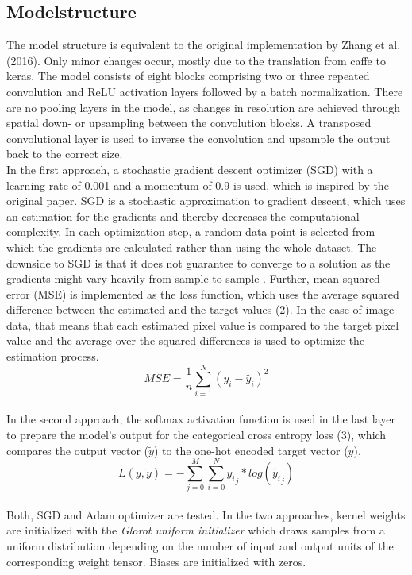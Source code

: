 \documentclass[12pt,letterpaper]{article}
\begin{document}
\subsection{Modelstructure}
The model structure is equivalent to the original implementation by Zhang et al. (2016). Only minor changes occur, mostly due to the translation from caffe to keras. The model consists of eight blocks comprising two or three repeated convolution and ReLU activation layers followed by a batch normalization. There are no pooling layers in the model, as changes  in  resolution  are  achieved  through  spatial  down-  or  upsampling between the convolution blocks. A transposed convolutional layer is used to inverse the convolution and upsample the output back to the correct size.\\
In the first approach, a stochastic gradient descent optimizer (SGD) with a learning rate of 0.001 and a momentum of 0.9 is used, which is inspired by the original paper. SGD is a stochastic approximation to gradient descent, which uses an estimation for the gradients and thereby decreases the computational complexity. In each optimization step, a random data point is selected from which the gradients are calculated rather than using the whole dataset. The downside to SGD is that it does not guarantee to converge to a solution as the gradients might vary heavily from sample to sample \citep{Lecture.2019}. Further,  mean squared error (MSE) is implemented as the loss function, which uses the average squared difference between the estimated and the target values (2). In the case of image data, that means that each estimated pixel value is compared to the target pixel value and the average over the squared differences is used to optimize the estimation process.
\begin{equation}
MSE = \frac{1}{n}\sum_{i=1}^N(y_i - \tilde{y_i})^2
\end{equation}
\\
In the second approach, the softmax activation function is used in the last layer to prepare the model’s output for the categorical cross entropy loss (3), which compares the output vector ($\tilde{y}$) to the one-hot encoded target vector ($y$).
\begin{equation}
L(y,\tilde{y}) = -\sum_{j=0}^M \sum_{i=0}^N
{{y_i}_j}*log({\tilde{y_i}_j})
\end{equation}
\\
Both, SGD and Adam optimizer are tested. In the two approaches, kernel weights are initialized with the \emph{Glorot uniform initializer} which draws samples from a uniform distribution depending on the number of input and output units of the corresponding weight tensor. Biases are initialized with zeros.
\end{document}
